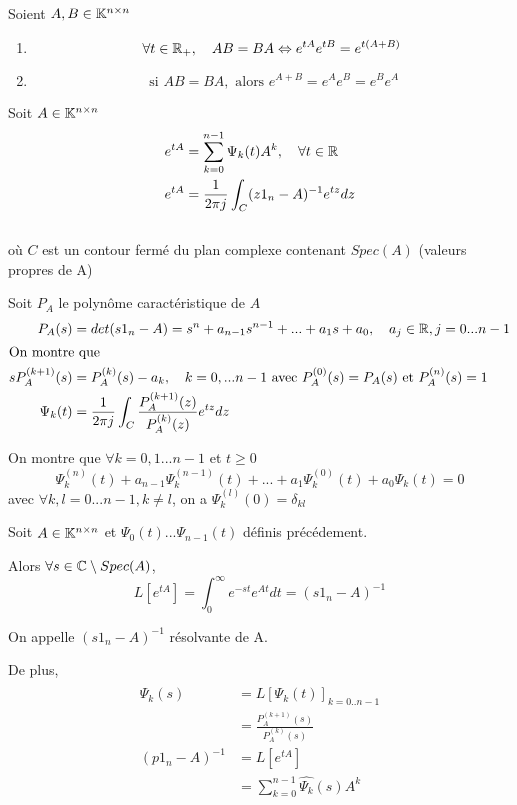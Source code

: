\documentclass[main.tex]{subfiles}
\begin{document}
\begin{prop}
Soient $A,B \in \mathbb{K}^{n \times n}$
\begin{enumerate}
\item \[\forall t \in \mathbb{R}_+, \quad AB = BA \Leftrightarrow e^{tA}e^{tB} = e^{t(A+B)} \]
\item \[ \text{ si } AB = BA, \text{ alors } e^{A+B} = e^A e^B = e^Be^A \]
\end{enumerate}
\end{prop}


\begin{thm}

Soit $A\in \mathbb{K}^{n\times n}$
\begin{align*}
e^{tA} & = \sum_{k=0}^{n-1} \Psi_k(t)A^k, \quad \forall t \in \mathbb{R} \\
e^{tA} & = \frac{1}{2\pi j} \int_C (z1_n-A)^{-1} e^{tz} dz
\end{align*}\\[2em]

où $C$ est un contour fermé du plan complexe contenant $Spec(A)$ (valeurs propres de A)
\end{thm}
Soit $P_A$ le polynôme caractéristique de $A$
\begin{align*}
P_A(s) & = det(s1_n-A)  = s^n + a_{n-1}s^{n-1} + ... + a_1s + a_0, \quad a_j \in \mathbb{R}, j=0...n-1 \\
\intertext{On montre que}
sP_A^{(k+1)}(s) & = P_A^{(k)}(s) - a_k, \quad k=0,...n-1 \text{ avec } P_A^{(0)}(s) = P_A(s) \text{ et } P_A^{(n)}(s) = 1 \\
\Psi_k(t) & = \frac{1}{2\pi j} \int_C \frac{P_A^{(k+1)}(z)}{P_A^{(k)}(z)} e^{tz} dz
\end{align*}

On montre que $\forall k = 0,1...n-1$ et $t\geq 0$
\[ \Psi_k^{(n)}(t) + a_{n-1} \Psi_k^{(n-1)}(t) + ... + a_1\Psi_k^{(0)}(t) + a_0\Psi_k(t) = 0 \]
avec $\forall k,l= 0...n-1, k\neq l$, on a $\Psi_k^{(l)}(0) = \delta_{kl}$

\begin{thm}
Soit $A\in \mathbb{K}^{n\times n}$ et $\Psi_0(t)...\Psi_{n-1}(t)$ définis précédement.

Alors $\forall s \in \mathbb{C} \setminus Spec(A)$,
\[ L[e^{tA}] = \int_0^{\infty} e^{-st}e^{At} dt = (s1_n-A)^{-1} \]

On appelle $(s1_n-A)^{-1}$ résolvante de A.

\end{thm}
De plus,
\begin{align*}
\hat{\Psi_k}(s) & = L[\Psi_k(t)]_{k=0..n-1} \\
& = \frac{P_A^{(k+1)}(s)}{P_A^{(k)}(s)} \\
(p1_n-A)^{-1}  & = L[e^{tA}] \\
& = \sum_{k=0}^{n-1}\hat{\Psi_k}(s)A^k
\end{align*}
\end{document}
